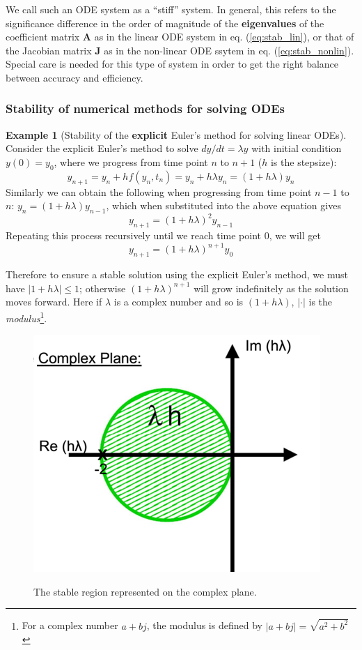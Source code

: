 \documentclass[a4paper,11pt]{article}
\newcommand{\bm}{\mathbf}
\theoremstyle{definition}
\newtheorem{exmp}{Example}[section]
\begin{document}
We call such an ODE system as a ``stiff'' system. In general, this refers to the significance difference in the order of 
magnitude of the \textbf{eigenvalues} of the coefficient matrix $\bm A$ as in the linear ODE system  in eq. (\ref{eq:stab_lin}),
or that of the Jacobian matrix $\bm J$ as in the non-linear ODE ssytem in eq. (\ref{eq:stab_nonlin}). 
Special care is needed for this type of system in order to get the right balance between accuracy and efficiency.

\subsubsection*{Stability of numerical methods for solving ODEs}

\begin{exmp}[Stability of the \textbf{explicit} Euler's method for solving linear ODEs]
Consider the explicit Euler's method to solve $d y / d t = \lambda y$ with initial condition $y(0) = y_0$, where
we progress from time point $n$ to $n+1$ ($h$ is the stepsize):
\[
	y_{n+1} = y_n + h f(y_n, t_n) = y_n + h \lambda y_n = (1 + h \lambda ) y_n
\]
\noindent Similarly we can obtain the following when progressing from time point $n-1$ to $n$:
$y_n = (1 + h \lambda ) y_{n-1}$, which when substituted into the above equation gives
\[
	y_{n+1} = (1 + h \lambda )^2 y_{n-1}
\]
\noindent Repeating this process recursively until we reach time point 0, we will get 
\[
	y_{n+1} = (1 + h \lambda )^{n+1} y_0
\]

Therefore to ensure a stable solution using the explicit Euler's method, we must have
$| 1 + h \lambda | \leq 1$; otherwise $(1 + h \lambda )^{n+1}$ will grow indefinitely as the solution moves forward.
Here if $\lambda$ is a complex number and so is $(1 + h \lambda)$, $| \cdot |$ is the \emph{modulus}\footnote{For a complex number
$a + b j$, the modulus is defined by $| a + b j | = \sqrt{ a^2 + b ^ 2}$}.

\begin{figure} [!h]
 \begin{center}
	\includegraphics[width=.4\textwidth]{stab_euler_exp}\\
 \end{center}
 \caption{The stable region represented on the complex plane.} 
 \label{fig:stab_euler_exp}
\end{figure}


\end{exmp}
\end{document}
